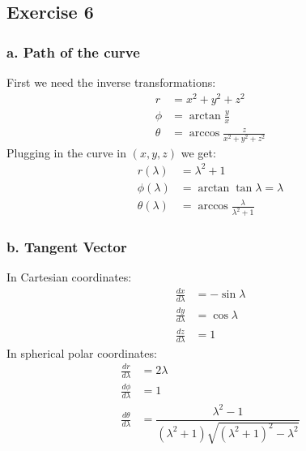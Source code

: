 \subsection{Exercise 6}
\subsubsection{a. Path of the curve}
First we need the inverse transformations:
\begin{align}
    r &= x^2 + y^2 + z^2 \\
    \phi &= \arctan{\frac{y}{x}} \\
    \theta &= \arccos{\frac{z}{x^2 + y^2 + z^2}}
\end{align}
Plugging in the curve in $(x,y,z)$ we get:
\begin{align}
    r(\lambda) &= \lambda^2 + 1 \\
    \phi(\lambda) &= \arctan{\tan{\lambda}} = \lambda \\
    \theta(\lambda) &= \arccos{\frac{\lambda}{\lambda^2+1}}
\end{align}
\subsubsection{b. Tangent Vector}
In Cartesian coordinates:
\begin{align}
    \frac{dx}{d\lambda} &= -\sin{\lambda} \\
    \frac{dy}{d\lambda} &= \cos{\lambda} \\
    \frac{dz}{d\lambda} &= 1
\end{align}
In spherical polar coordinates:
\begin{align}
    \frac{dr}{d\lambda} &= 2\lambda \\
    \frac{d\phi}{d\lambda} &= 1 \\
    \frac{d\theta}{d\lambda} &= \dfrac{{\lambda}^2-1}{\left({\lambda}^2+1\right)\sqrt{\left({\lambda}^2+1\right)^2-{\lambda}^2}}
\end{align}
